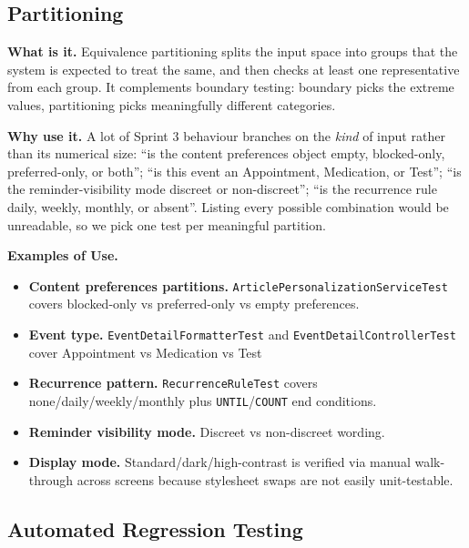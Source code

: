 \documentclass[a4paper, 12pt]{article}
\begin{document}
    \subsection{Partitioning}

    \textbf{What is it.} Equivalence partitioning splits the input space into groups
    that the system is expected to treat the same, and then checks at least one
    representative from each group. It complements boundary testing: boundary
    picks the extreme values, partitioning picks meaningfully different categories.

    \textbf{Why use it.} A lot of Sprint 3 behaviour branches on the \textit{kind}
    of input rather than its numerical size: ``is the content preferences object
    empty, blocked-only, preferred-only, or both''; ``is this event an
    Appointment, Medication, or Test''; ``is the reminder-visibility mode discreet
    or non-discreet''; ``is the recurrence rule daily, weekly, monthly, or absent''.
    Listing every possible combination would be unreadable, so we pick one test per
    meaningful partition.

    \textbf{Examples of Use.}

    \begin{itemize}
        \item \textbf{Content preferences partitions.} \texttt{ArticlePersonalizationServiceTest}
            covers blocked-only vs preferred-only vs empty preferences.

        \item \textbf{Event type.} \texttt{EventDetailFormatterTest} and \texttt{EventDetailControllerTest}
            cover Appointment vs Medication vs Test

        \item \textbf{Recurrence pattern.} \texttt{RecurrenceRuleTest} covers none/daily/weekly/monthly
            plus \texttt{UNTIL}/\texttt{COUNT} end conditions.

        \item \textbf{Reminder visibility mode.} Discreet vs non-discreet
            wording.

        \item \textbf{Display mode.} Standard/dark/high-contrast is verified via
            manual walk-through across screens because stylesheet swaps are not
            easily unit-testable.
    \end{itemize}

    \subsection{Automated Regression Testing}
\end{document}
